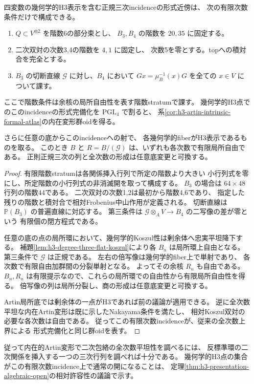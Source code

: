 \begin{theorem}\label{thm:h3-finite-degree-normal-incidence}
四変数の幾何学的H3表示を含む正規三次incidenceの形式近傍は、
次の有限次数条件だけで構成できる。
\begin{enumerate}
 \item $Q\subset V^{\otimes2}$ を階数6の部分束とし、
 $B_3,B_4$ の階数を $20,35$ に固定する。
 \item 二次双対の次数3,4の階数を $4,1$ に固定し、
 次数5を零とする。topへの積対合を完全とする。
 \item $B_3$ の切断直線 $\mathcal G$ に対し、$B_4$ において
 $Gx=\mu_B^{-1}(x)G$ を全ての $x\in V$ について課す。
\end{enumerate}
ここで階数条件は余核の局所自由性を表す階数stratumで課す。
幾何学的H3点でのこのincidenceの形式完備化を
$\mathrm{PGL}_4$ で割ると、
系\ref{cor:h3-artin-intrinsic-formal-atlas}の内在変形群oidを得る。

さらに任意の底からこのincidenceへの射で、
各幾何学的fiberがH3表示であるものを取る。
このとき $B$ と $R=B/(\mathcal G)$ は、いずれも各次数で有限局所自由である。
正則正規三次の列と全次数の形成は任意底変更と可換する。
\end{theorem}
\begin{proof}
有限階数stratumは各関係挿入行列で所定の階数より大きい
小行列式を零にし、所定階数の小行列式の非消滅開を取って構成する。
$B_3$ の場合は $64\times48$ 行列の階数44である。
二次双対の次数1,2は最初から階数4,6であり、
指定した残りの階数と積対合で相対Frobenius中山作用が定義される。
切断直線は $\mathbb P(B_3)$ の普遍直線に対応する。
第三条件は $\mathcal G\otimes_A V\to B_4$ の二写像の差が零という
有限個の閉方程式である。

任意の底の点の局所環において、幾何学的Koszul性は剰余体へ忠実平坦降下する。
補題\ref{lem:h3-degree-three-flat-koszul}により各 $B_n$ は局所環上自由となる。
第三条件で $\mathcal G$ は正規である。
左右の倍写像は幾何学的fiber上で単射であり、
各次数で有限自由加群間の分裂単射となる。
よってその余核 $R_n$ も自由である。
$B_n,R_n$ は有限提示なので、これらの局所環での自由性から有限局所自由性を得る。
倍写像の列は局所分裂し、商の形成は任意底変更と可換する。

Artin局所底では剰余体の一点がH3であれば前の議論が適用できる。
逆に全次数平坦な内在Artin変形は既に示したNakayama条件を満たし、
相対Koszul双対の必要な各次数は自由である。
従ってこの有限次数incidenceが、従来の全次数上界による
形式完備化と同じ群oidを表す。
\end{proof}

従って内在的Artin変形で二次包絡の全次数平坦性を調べるには、
反標準環の二次関係を挿入する一つの三次行列を調べれば十分である。
幾何学的H3点の集合がこの有限次数incidence上で通常の開になることは、
定理\ref{thm:h3-presentation-algebraic-open}の相対許容性の議論で示す。

